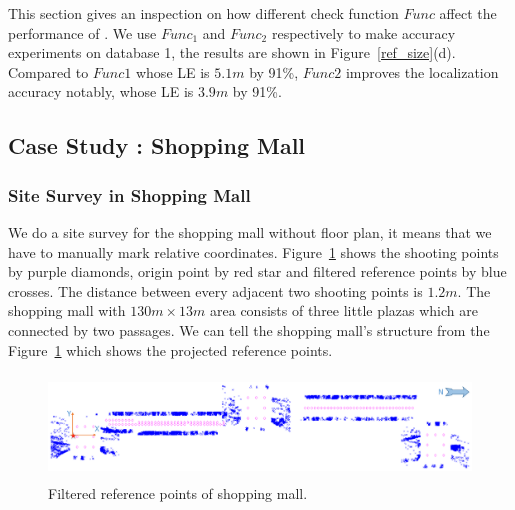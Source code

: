 This section gives an inspection on how different check function $Func$ affect the performance of \oursystem. We use $Func_1$ and $Func_2$ respectively to make accuracy experiments on database 1, the results are shown in Figure~\ref{ref_size}(d). Compared to $Func1$ whose LE is $5.1m$ by 91\%, $Func2$ improves the localization accuracy notably, whose LE is $3.9m$ by 91\%.

\subsection{Case Study \uppercase\expandafter{}: Shopping Mall}
\subsubsection{Site Survey in Shopping Mall}
We do a site survey for the shopping mall without floor plan, it means that we have to manually mark relative coordinates. Figure~\ref{mall_ref} shows the shooting points by purple diamonds, origin point by red star and filtered reference points by blue crosses. The distance between every adjacent two shooting points is $1.2m$. The shopping mall with $130m\times 13m$ area consists of three little plazas which are connected by two passages. We can tell the shopping mall's structure from the Figure~\ref{mall_ref} which shows the projected reference points.
\begin{figure}[t!]
\centering
\includegraphics[width=1\linewidth, height=1.1in, clip, keepaspectratio]{mallref2.eps}
\caption{Filtered reference points of shopping mall.}\label{mall_ref}
\end{figure}
